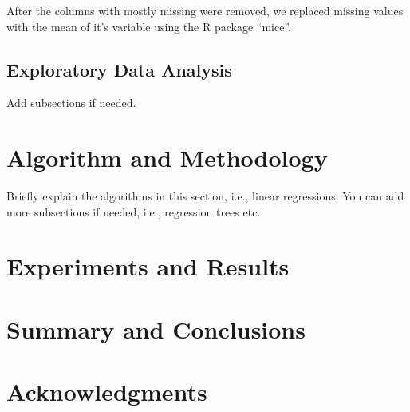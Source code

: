 \documentclass[fleqn,10pt]{SelfArx} %
\begin{document}
After the columns with mostly missing were removed, we replaced missing values with the mean of it's variable using the R package ``mice''.
\subsection{Exploratory Data Analysis}

Add subsections if needed.
\bigskip
\bigskip


\section{Algorithm and Methodology}

Briefly explain the algorithms in this section, i.e., linear regressions. You can add more subsections if needed, i.e., regression trees etc.


\bigskip
\bigskip
\section{Experiments and Results}


\bigskip
\bigskip
\section{Summary and Conclusions}
\bigskip
\bigskip
\bigskip



\section*{Acknowledgments} %







\end{document}
